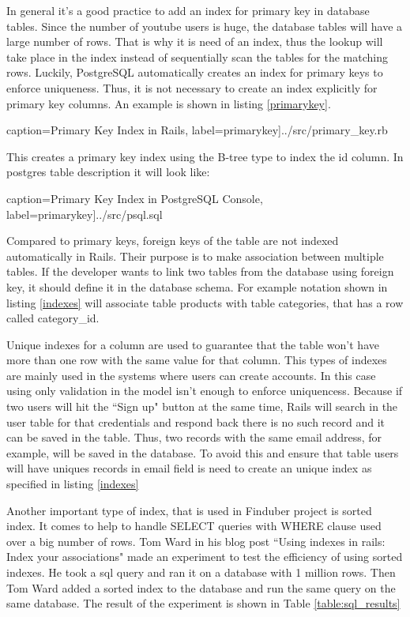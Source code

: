 In general it's a good practice to add an index for primary key in database tables. Since the number of youtube users is huge, the database tables will have a large number of rows. That is why it is need of an index, thus the lookup will take place in the index instead of sequentially scan the tables for the matching rows. Luckily, PostgreSQL automatically creates an index for primary keys to enforce uniqueness. Thus, it is not necessary to create an index explicitly for primary key columns. An example is shown in listing \ref{primarykey}. 

 caption={Primary Key Index in Rails}, label=primarykey]{../src/primary_key.rb}

This creates a primary key index using the B-tree type to index the id column. In postgres table description it will look like: 

 caption={Primary Key Index in PostgreSQL Console}, label=primarykey]{../src/psql.sql}


Compared to primary keys, foreign keys of the table are not indexed automatically in Rails. Their purpose is to make association between multiple tables. If the developer wants to link two tables from the database using foreign key, it should define it in the database schema. For example notation shown in listing \ref{indexes} will associate table products with table categories, that has a row called category\_id.

Unique indexes for a column are used to guarantee that the table won't have more than one row with the same value for that column. This types of indexes are mainly used in the systems where users can create accounts. In this case using only validation in the model isn't enough to enforce uniquencess. Because if two users will hit the ``Sign up" button at the same time, Rails will search in the user table for that credentials and respond back there is no such record and it can be saved in the table. Thus, two records with the same email address, for example, will be saved in the database. To avoid this and ensure that table users will have uniques records in email field is need to create an unique index as specified in listing \ref{indexes}


Another important type of index, that is used in Finduber project is sorted index. It comes to help to handle SELECT queries with WHERE clause used over a big number of rows. Tom Ward in his blog post ``Using indexes in rails: Index your associations" made an experiment to test the efficiency of using sorted indexes. He took a sql query and ran it on a database with 1 million rows. Then Tom Ward added a sorted index to the database and run the same query on the same database. The result of the experiment is shown in Table \ref{table:sql_results}

